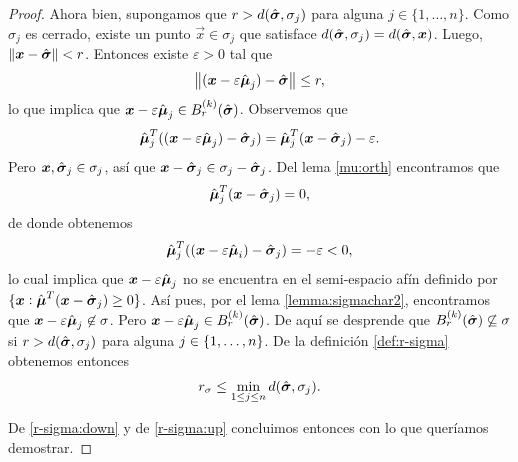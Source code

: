 \begin{proof}
	Ahora bien, supongamos que $r > d(\hat{\boldsymbol{ \sigma }}, \sigma_j)$ para alguna $j \in \lbrace 1, \ldots,
	n \rbrace$. Como $\sigma_j$ es cerrado, existe un punto $\vec{x} \in \sigma_j$ que satisface
	$d(\hat{\boldsymbol{ \sigma }}, \sigma_j) = d(\hat{\boldsymbol{ \sigma }}, \boldsymbol{x})$. Luego, $\left\lVert \boldsymbol{x} - \hat{\boldsymbol{ \sigma }} \right\rVert <
	r$. Entonces existe $\varepsilon > 0$ tal que
	\begin{equation*}
		\left\lVert (\boldsymbol{x} - \varepsilon\hat{\boldsymbol{ \mu }}_j) - \hat{\boldsymbol{ \sigma }} \right\rVert \leq r,
	\end{equation*}
	lo que implica que $\boldsymbol{x} - \varepsilon\hat{\boldsymbol{ \mu }}_j \in
	B_r^{(k)}(\hat{\boldsymbol{ \sigma }})$. Observemos que
	\begin{equation*}
		\hat{\boldsymbol{\mu}}_j^T((\boldsymbol{x} - \varepsilon\hat{\boldsymbol{\mu}}_j) - \hat{\boldsymbol{ \sigma }}_j)
		=
		\hat{\boldsymbol{\mu}}_j^T(\boldsymbol{x} - \hat{\boldsymbol{ \sigma }}_j) - \varepsilon.
	\end{equation*}
	Pero $\boldsymbol{x}, \hat{\boldsymbol{ \sigma }}_j \in \sigma_j$, así que $\boldsymbol{x} - \hat{\boldsymbol{ \sigma }}_j \in \sigma_j -
	\hat{\boldsymbol{ \sigma }}_j$. Del lema \ref{mu:orth} encontramos que
	\begin{equation*}
		\hat{\boldsymbol{\mu}}_j^T(\boldsymbol{x} - \hat{\boldsymbol{ \sigma }}_j) = 0,
	\end{equation*}
	de donde obtenemos
	\begin{equation*}
		\hat{\boldsymbol{\mu}}_j^T((\boldsymbol{x} - \varepsilon\hat{\boldsymbol{\mu}}_i) - \hat{\boldsymbol{ \sigma }}_j)
		= -\varepsilon < 0,
	\end{equation*}
	lo cual implica que $\boldsymbol{x} - \varepsilon\hat{\boldsymbol{\mu}}_j$ no se encuentra en el semi-espacio
	afín definido por $\lbrace \boldsymbol{x} \vcentcolon \hat{\boldsymbol{\mu}}^T(\boldsymbol{x} - \hat{\boldsymbol{ \sigma }}_j) \geq 0 \rbrace$. Así pues,
	por el lema \ref{lemma:sigmachar2}, encontramos que $\boldsymbol{x} - \varepsilon\hat{\boldsymbol{\mu}}_j \not\in
	\sigma$. Pero $\boldsymbol{x} - \varepsilon\hat{\boldsymbol{\mu}}_j \in B_r^{(k)}(\hat{\boldsymbol{ \sigma }})$. De aquí se desprende
	que $B_r^{(k)}(\hat{\boldsymbol{ \sigma }}) \not\subseteq \sigma$ si $r > d(\hat{\boldsymbol{ \sigma }}, \sigma_j)$ para
	alguna $j \in \lbrace 1, \ldots, n \rbrace$. De la definición \ref{def:r-sigma} obtenemos entonces
	\begin{equation}
		\label{r-sigma:up}
		r_\sigma \leq \min_{1 \leq j \leq n}d(\hat{\boldsymbol{ \sigma }}, \sigma_j).
	\end{equation}

	De \eqref{r-sigma:down} y de \eqref{r-sigma:up} concluimos entonces con lo que queríamos
	demostrar.
\end{proof}

